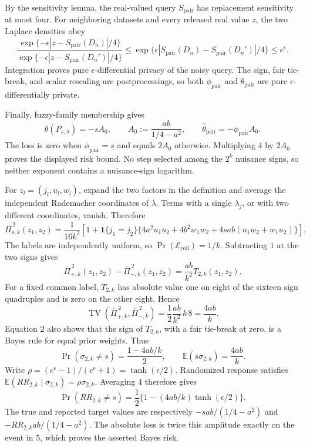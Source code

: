 By the sensitivity lemma, the real-valued query \(S_{\mathrm{pair}}\) has replacement sensitivity at most four.  For neighboring datasets and every released real value \(z\), the two Laplace densities obey
\[
 \frac{\exp\{-\epsilon|z-S_{\mathrm{pair}}(D_n)|/4\}}
      {\exp\{-\epsilon|z-S_{\mathrm{pair}}(D_n')|/4\}}
 \le \exp\{\epsilon|S_{\mathrm{pair}}(D_n)-S_{\mathrm{pair}}(D_n')|/4\}
 \le e^\epsilon.
\]
Integration proves pure \(\epsilon\)-differential privacy of the noisy query.  The sign, fair tie-break, and scalar rescaling are postprocessings, so both \(\phi_{\mathrm{pair}}\) and \(\widehat\theta_{\mathrm{pair}}\) are pure \(\epsilon\)-differentially private.

Finally, fuzzy-family membership gives
\[
 \theta(P_{s,\lambda})=-sA_0,
 \qquad A_0:=\frac{ab}{1/4-a^2},
 \qquad \widehat\theta_{\mathrm{pair}}=-\phi_{\mathrm{pair}}A_0.
\]
The loss is zero when \(\phi_{\mathrm{pair}}=s\) and equals \(2A_0\) otherwise.  Multiplying \(4\) by \(2A_0\) proves the displayed risk bound.  No step selected among the \(2^k\) nuisance signs, so neither exponent contains a nuisance-sign logarithm.

For \(z_l=(j_l,u_l,w_l)\), expand the two factors in the definition and average the independent Rademacher coordinates of \(\lambda\).  Terms with a single \(\lambda_j\), or with two different coordinates, vanish.  Therefore
\[
 \overline\Pi_{s,k}^{\,2}(z_1,z_2)
 =\frac1{16k^2}\left[1+\mathbf1\{j_1=j_2\}
 \{4a^2u_1u_2+4b^2w_1w_2+4sab(u_1w_2+w_1u_2)\}\right]. \tag{1}
\]
The labels are independently uniform, so \(\Pr(\mathcal E_{\mathrm{coll}})=1/k\).  Subtracting \(1\) at the two signs gives
\[
 \overline\Pi_{+,k}^{\,2}(z_1,z_2)
 -\overline\Pi_{-,k}^{\,2}(z_1,z_2)
 =\frac{ab}{k^2}T_{2,k}(z_1,z_2). \tag{2}
\]
For a fixed common label, \(T_{2,k}\) has absolute value one on eight of the sixteen sign quadruples and is zero on the other eight.  Hence
\[
 \operatorname{TV}(\overline\Pi_{+,k}^{\,2},\overline\Pi_{-,k}^{\,2})
 =\frac12\frac{ab}{k^2}\,k\,8=\frac{4ab}{k}. \tag{3}
\]
Equation \(2\) also shows that the sign of \(T_{2,k}\), with a fair tie-break at zero, is a Bayes rule for equal prior weights.  Thus
\[
 \Pr(\sigma_{2,k}\ne s)=\frac{1-4ab/k}{2},
 \qquad
 \mathbb E(s\sigma_{2,k})=\frac{4ab}{k}. \tag{4}
\]
Write \(\rho=(e^\epsilon-1)/(e^\epsilon+1)=\tanh(\epsilon/2)\).  Randomized response satisfies \(\mathbb E(RR_{2,k}\mid\sigma_{2,k})=\rho\sigma_{2,k}\).  Averaging \(4\) therefore gives
\[
 \Pr(RR_{2,k}\ne s)
 =\frac12\{1-(4ab/k)\tanh(\epsilon/2)\}. \tag{5}
\]
The true and reported target values are respectively
\(-sab/(1/4-a^2)\) and \(-RR_{2,k}ab/(1/4-a^2)\).  The absolute loss is twice this amplitude exactly on the event in \(5\), which proves the asserted Bayes risk.

